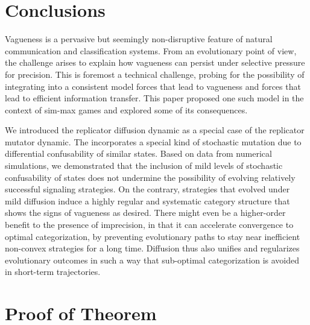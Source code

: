 \documentclass[fleqn,reqno,10pt]{article}
\newcommand{\rdd}{\acro{rdd}} %
\begin{document}
\section{Conclusions}
\label{sec:conclusions}

Vagueness is a pervasive but seemingly non-disruptive feature of
natural communication and classification systems. From an evolutionary
point of view, the challenge arises to explain how vagueness can
persist under selective pressure for precision. This is foremost a
technical challenge, probing for the possibility of integrating into a
consistent model forces that lead to vagueness and forces that lead
to efficient information transfer. This paper proposed one such model
in the context of sim-max games and explored some of its consequences.

We introduced the replicator diffusion dynamic as a special case of
the replicator mutator dynamic. The \rdd incorporates a special kind
of stochastic mutation due to differential confusability of similar
states. Based on data from numerical simulations, we demonstrated that
the inclusion of mild levels of stochastic confusability of states
does not undermine the possibility of evolving relatively successful
signaling strategies. On the contrary, strategies that evolved under
mild diffusion induce a highly regular and systematic category
structure that shows the signs of vagueness as desired. There might
even be a higher-order benefit to the presence of imprecision, in that
it can accelerate convergence to optimal categorization, by preventing
evolutionary paths to stay near inefficient non-convex strategies for
a long time. Diffusion thus also unifies and regularizes evolutionary
outcomes in such a way that sub-optimal categorization is avoided in
short-term trajectories.



\appendix

\section{Proof of Theorem}
\label{sec:proofs}
\end{document}
